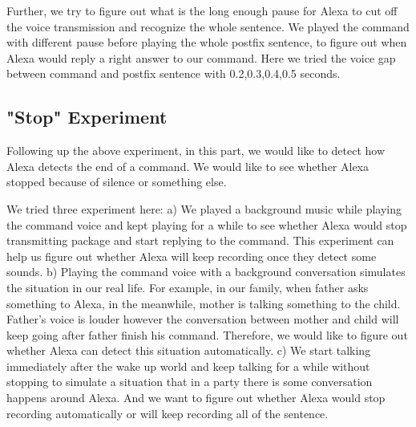 Further, we try to figure out what is the long enough pause for Alexa to cut off the voice transmission and recognize the whole sentence. We played the command with different pause before playing the whole postfix sentence, to figure out when Alexa would reply a right answer to our command. Here we tried the voice gap between command and postfix sentence with 0.2,0.3,0.4,0.5 seconds.

\subsection{"Stop" Experiment}

Following up the above experiment, in this part, we would like to detect how Alexa detects the end of a command. We would like to see whether Alexa stopped because of silence or something else.

We tried three experiment here: a) We played a background music while playing the command voice and kept playing for a while to see whether Alexa would stop transmitting package and start replying to the command. This experiment can help us figure out whether Alexa will keep recording once they detect some sounds. b) Playing the command voice with a background conversation simulates the situation in our real life. For example, in our family, when father asks something to Alexa, in the meanwhile, mother is talking something to the child. Father's voice is louder however the conversation between mother and child will keep going after father finish his command. Therefore, we would like to figure out whether Alexa can detect this situation automatically. c) We start talking immediately after the wake up world and keep talking for a while without stopping to simulate a situation that in a party there is some conversation happens around Alexa. And we want to figure out whether Alexa would stop recording automatically or will keep recording all of the sentence.



